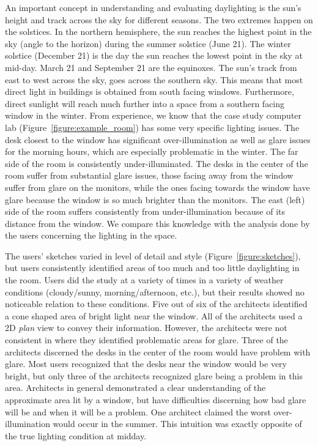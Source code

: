 An important concept in understanding and evaluating daylighting is
the sun's height and track across the sky for different seasons.  The
two extremes happen on the solstices.  In the northern hemisphere, the
sun reaches the highest point in the sky (angle to the horizon) during
the summer solstice (June 21).  The winter solstice (December 21) is
the day the sun reaches the lowest point in the sky at mid-day.  March
21 and September 21 are the equinoxes.  The sun's track from east to
west across the sky, goes across the southern sky.  This means that
most direct light in buildings is obtained from south facing windows.
Furthermore, direct sunlight will reach much further into a space from
a southern facing window in the winter.
%
From experience, we know that the case study computer lab
(Figure~\ref{figure:example_room}) has some very specific lighting issues.
The desk closest to the window has significant over-illumination as
well as glare issues for the morning hours, which are especially
problematic in the winter.  The far side of the room is consistently
under-illuminated.  The desks in the center of the room suffer from
substantial glare issues, those facing away from the window suffer
from glare on the monitors, while the ones facing towards the window
have glare because the window is so much brighter than the monitors.
The east (left) side of the room suffers consistently from
under-illumination because of its distance from the window.  We
compare this knowledge with the analysis done by the users concerning
the lighting in the space.

The users' sketches varied in level of detail and style
(Figure~\ref{figure:sketches}), but users consistently identified
areas of too much and too little daylighting in the room.  Users did
the study at a variety of times in a variety of weather conditions
(cloudy/sunny, morning/afternoon, etc.), but their results showed no
noticeable relation to these conditions.  Five out of six of the
architects identified a cone shaped area of bright light near the
window.  All of the architects used a 2D {\em plan} view to convey
their information.  However, the architects were not consistent in
where they identified problematic areas for glare.  Three of the
architects discerned the desks in the center of the room would have
problem with glare.  Most users recognized that the desks near the
window would be very bright, but only three of the architects
recognized glare being a problem in this area.  Architects in general
demonstrated a clear understanding 
of the approximate area lit by a
window, but have difficulties discerning how bad glare will be and
when it will be a problem.  One architect claimed the worst
over-illumination would occur in the summer.  This intuition was
exactly opposite of the true lighting condition at midday.

